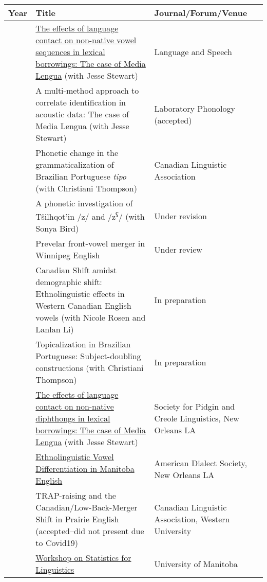 \documentclass[
]{article}
\begin{document}
\begin{longtable}[]{@{}
  >{\raggedright\arraybackslash}p{}
  >{\raggedright\arraybackslash}p{}
  >{\raggedright\arraybackslash}p{}@{}}
\toprule
Year & Title & Journal/Forum/Venue \\
\midrule
\endhead
2021 &
\href{pdf/Onosson,\%20Stewart\%20-\%202021\%20-\%20Language\%20and\%20Speech.pdf}{The
effects of language contact on non-native vowel sequences in lexical
borrowings: The case of Media Lengua} (with Jesse Stewart) & Language
and Speech \\
~ & A multi-method approach to correlate identification in acoustic
data: The case of Media Lengua (with Jesse Stewart) & Laboratory
Phonology (accepted) \\
~ & Phonetic change in the grammaticalization of Brazilian Portuguese
\emph{tipo} (with Christiani Thompson) & Canadian Linguistic
Association \\
~ & A phonetic investigation of Tŝilhqot'in /z/ and
/z\textsuperscript{ʕ}/ (with Sonya Bird) & Under revision \\
~ & Prevelar front-vowel merger in Winnipeg English & Under review \\
~ & Canadian Shift amidst demographic shift: Ethnolinguistic effects in
Western Canadian English vowels (with Nicole Rosen and Lanlan Li) & In
preparation \\
~ & Topicalization in Brazilian Portuguese: Subject-doubling
constructions (with Christiani Thompson) & In preparation \\
2020 &
\href{pdf/Onosson,\%20Stewart\%20-\%202020\%20-\%20Society\%20for\%20Pidgin\%20and\%20Creole\%20Linguistics.pdf}{The
effects of language contact on non-native diphthongs in lexical
borrowings: The case of Media Lengua} (with Jesse Stewart) & Society for
Pidgin and Creole Linguistics, New Orleans LA \\
~ &
\href{pdf/Onosson,\%20Rosen\%20-\%202020\%20-\%20American\%20Dialect\%20Society.pdf}{Ethnolinguistic
Vowel Differentiation in Manitoba English} & American Dialect Society,
New Orleans LA \\
~ & TRAP-raising and the Canadian/Low-Back-Merger Shift in Prairie
English (accepted--did not present due to Covid19) & Canadian Linguistic
Association, Western University \\
2019 & \href{https://github.com/onosson/UM_Workshop}{Workshop on
Statistics for Linguistics} & University of Manitoba \\

\end{longtable}
\end{document}
